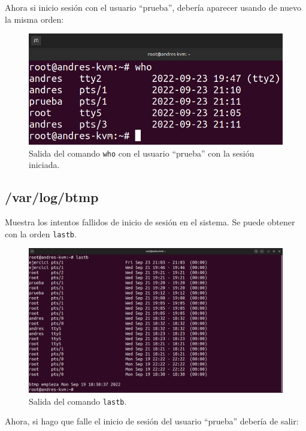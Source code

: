 \documentclass{article}
\begin{document}
\bigskip

Ahora si inicio sesión con el usuario ``prueba'', debería aparecer usando de nuevo la misma orden:

\begin{figure}[H]
    \includegraphics[width=\textwidth]{imagenes/whoprueba.png}
    \caption{Salida del comando \texttt{who} con el usuario ``prueba'' con la sesión iniciada.}
\end{figure}

\newpage

\subsection{/var/log/btmp}
Muestra los intentos fallidos de inicio de sesión en el sistema. Se puede obtener con la orden \verb|lastb|.

\begin{figure}[H]
    \includegraphics[width=\textwidth]{imagenes/lastbnormal.png}
    \caption{Salida del comando \texttt{lastb}.}
\end{figure}

\bigskip

Ahora, si hago que falle el inicio de sesión del usuario ``prueba'' debería de salir:
\end{document}
